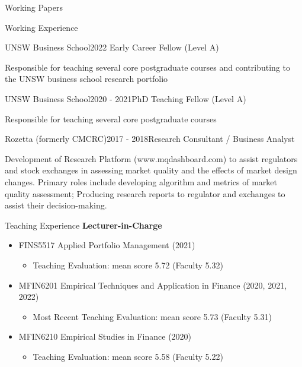 \documentclass{resume} %
\begin{document}
\begin{rSection}{Working Papers}
	\begin{rSection}{Working Experience}
		\begin{rSubsection}{UNSW Business School}{2022 \- }{Early Career Fellow (Level A)}{}
			\item Responsible for teaching several core postgraduate courses and contributing to the UNSW business school research portfolio
		\end{rSubsection}
		\begin{rSubsection}{UNSW Business School}{2020 - 2021}{PhD Teaching Fellow (Level A)}{}
			\item Responsible for teaching several core postgraduate courses
		\end{rSubsection}
		\begin{rSubsection}{Rozetta (formerly CMCRC)}{2017 - 2018}{Research Consultant / Business Analyst}{}
			\item Development of Research Platform (www.mqdashboard.com) to assist regulators and stock exchanges in assessing market quality and the effects of market design changes. Primary roles include developing algorithm and metrics of market quality assessment; Producing research reports to regulator and exchanges to assist their decision-making.
		\end{rSubsection}
	\end{rSection}

\end{rSection}
\begin{rSection}{Teaching Experience}
	\textbf{Lecturer-in-Charge}
	\begin{itemize}
		\item FINS5517 Applied Portfolio Management (2021)
		      \begin{itemize}
			      \item Teaching Evaluation: mean score 5.72 (Faculty 5.32)
		      \end{itemize}
		\item MFIN6201 Empirical Techniques and Application in Finance (2020, 2021, 2022)
		      \begin{itemize}
			      \item Most Recent Teaching Evaluation: mean score 5.73 (Faculty 5.31)
		      \end{itemize}
		\item MFIN6210 Empirical Studies in Finance (2020)
		      \begin{itemize}
			      \item Teaching Evaluation: mean score 5.58 (Faculty 5.22)
		      \end{itemize}
	\end{itemize}
\end{rSection}
\end{document}
